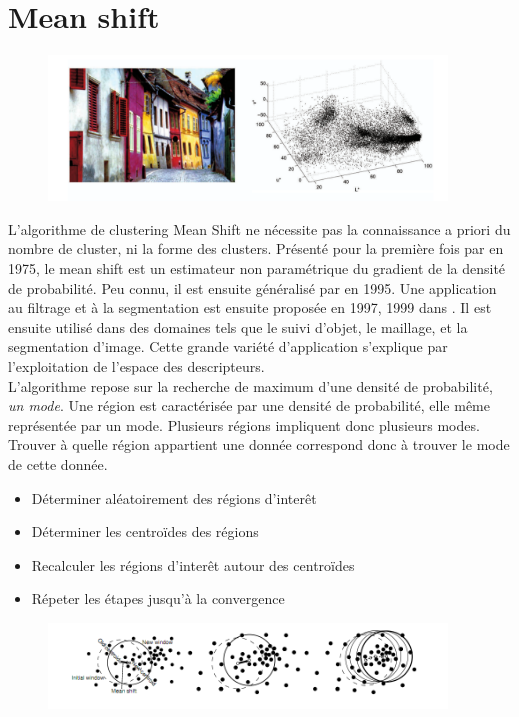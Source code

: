 \documentclass{article}
\begin{document}
\section{Mean shift}

\begin{figure}
\includegraphics[width=400px]{images/color_space.png}
\end{figure}

L'algorithme de clustering Mean Shift ne nécessite pas la connaissance a
priori du nombre de cluster, ni la forme des clusters. Présenté pour la
première fois par \cite{fukugana} en 1975, le mean shift est un estimateur non
paramétrique du gradient de la densité de probabilité. Peu connu, il est
ensuite généralisé par \cite{cheng} en 1995. Une application au filtrage et à la
segmentation est ensuite proposée en 1997, 1999 dans \cite{comaniciu_meer}. Il est ensuite
utilisé dans des domaines tels que le suivi d'objet, le maillage, et la
segmentation d'image. Cette grande variété d'application s'explique par
l'exploitation de l'espace des descripteurs. \\
L'algorithme repose sur la recherche de maximum d'une densité de probabilité,
\textit{un mode}. Une région est caractérisée par une densité de probabilité,
elle même représentée par un mode. Plusieurs régions impliquent donc plusieurs
modes. Trouver à quelle région appartient une donnée correspond donc à trouver
le mode de cette donnée.

\begin{itemize}
\item Déterminer aléatoirement des régions d'interêt
\item Déterminer les centroïdes des régions
\item Recalculer les régions d'interêt autour des centroïdes
\item Répeter les étapes jusqu'à la convergence
\end{itemize}

\begin{figure}
\includegraphics[width=400px]{images/mean_shift_proc.png}
\end{figure}
\end{document}
